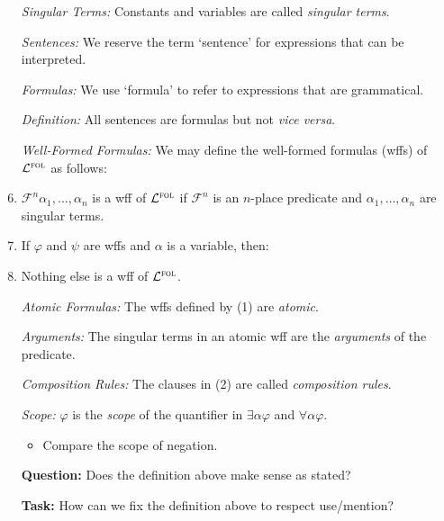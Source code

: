 \documentclass[a4paper, 11pt]{article} %
\begin{document}
\begin{enumerate}
  \item[\it Singular Terms:] Constants and variables are called \textit{singular terms}.
  \item[\it Sentences:] We reserve the term `sentence' for expressions that can be interpreted.
  \item[\it Formulas:] We use `formula' to refer to expressions that are grammatical.
  \item[\it Definition:] All sentences are formulas but not \textit{vice versa}.
  \item[\it Well-Formed Formulas:] We may define the well-formed formulas (wffs) of $\mathcal{L}^{\textsc{fol}}$ as follows:
  \item $\mathcal{F}^n\alpha_1,\ldots,\alpha_n$ is a wff of $\mathcal{L}^{\textsc{fol}}$ if $\mathcal{F}^n$ is an $n$-place predicate and $\alpha_1,\ldots,\alpha_n$ are singular terms.
  \item If $\varphi$ and $\psi$ are wffs and $\alpha$ is a variable, then:
    \begin{enumerate}
    \end{enumerate}
  \item Nothing else is a wff of $\mathcal{L}^{\textsc{fol}}$.
  \item[\it Atomic Formulas:] The wffs defined by (1) are \textit{atomic}.
  \item[\it Arguments:] The singular terms in an atomic wff are the \textit{arguments} of the predicate.
  \item[\it Composition Rules:] The clauses in (2) are called \textit{composition rules}.
  \item[\it Scope:] $\varphi$ is the \textit{scope} of the quantifier in $\exists \alpha \varphi$ and $\forall \alpha \varphi$.
    \begin{itemize}
      \item Compare the scope of negation.
    \end{itemize}
  \item[\bf Question:] Does the definition above make sense as stated?
  \item[\bf Task:] How can we fix the definition above to respect use/mention?
\end{enumerate}
\end{document}
